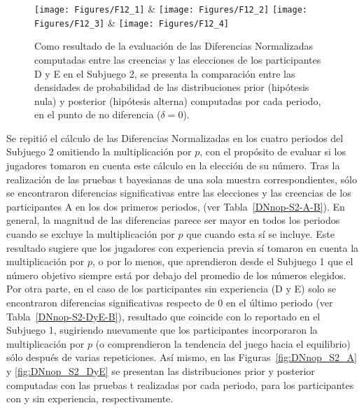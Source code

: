 \begin{figure}[hp]
\centering
\texttt{[image: Figures/F12\_1]} & \texttt{[image: Figures/F12\_2]} 
\texttt{[image: Figures/F12\_3]} & \texttt{[image: Figures/F12\_4]} 
\decoRule
\caption[Evaluación de las Diferencias Normalizadas entre creencias y elecciones en los participantes D y E en el Subjuego 2 (Factor de Bayes)]{Como resultado de la evaluación de las Diferencias Normalizadas computadas entre las creencias y las elecciones de los participantes D y E en el Subjuego 2, se presenta la comparación entre las densidades de probabilidad de las distribuciones prior (hipótesis nula) y posterior (hipótesis alterna) computadas por cada periodo, en el punto de no diferencia ($\delta = 0$).}
\label{fig:DN_S2_DyE}
\end{figure}  

Se repitió el cálculo de las Diferencias Normalizadas en los cuatro periodos del Subjuego 2 omitiendo la multiplicación por $p$, con el propósito de evaluar si los jugadores tomaron en cuenta este cálculo en la elección de su número. Tras la realización de las pruebas t bayesianas de una sola muestra correspondientes,  sólo se encontraron diferencias significativas entre las elecciones y las creencias de los participantes A en los dos primeros  periodos, (ver Tabla~\ref{DNnop-S2-A-B}). En general, la magnitud de las diferencias parece ser mayor en todos los periodos cuando se excluye la multiplicación por $p$ que cuando esta sí se incluye. Este resultado sugiere que los jugadores con experiencia previa sí tomaron en cuenta la multiplicación por $p$, o por lo menos, que aprendieron desde el Subjuego 1 que el número objetivo siempre está por debajo del promedio de los números elegidos.\\

Por otra parte, en el caso de los participantes sin experiencia (D y E) solo se encontraron diferencias significativas respecto de 0 en el último periodo (ver Tabla~\ref{DNnop-S2-DyE-B}), resultado que coincide con lo reportado en el Subjuego 1, sugiriendo nuevamente que los participantes incorporaron la multiplicación por $p$ (o comprendieron la tendencia del juego hacia el equilibrio)  sólo después de varias repeticiones. Así mismo, en las Figuras~\ref{fig:DNnop_S2_A} y \ref{fig:DNnop_S2_DyE} se presentan las distribuciones prior y posterior computadas con las pruebas t realizadas por cada periodo, para los participantes con y sin experiencia, respectivamente.\\

